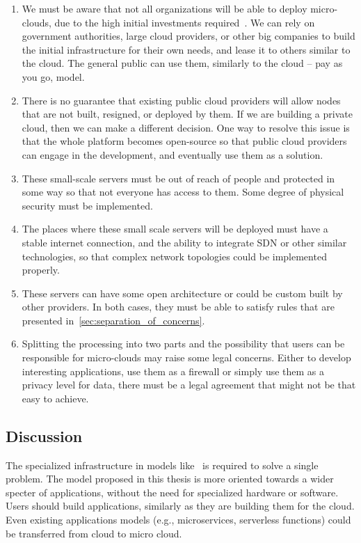 \begin{enumerate}[start=1,label={(\bfseries \arabic*)}]
	\item We must be aware that not all organizations will be able to deploy micro-clouds, due to the high initial investments required~\cite{MonsalveCC18}. We can rely on government authorities, large cloud providers, or other big companies to build the initial infrastructure for their own needs, and lease it to others similar to the cloud. The general public can use them, similarly to the cloud -- pay as you go, model.
	\item There is no guarantee that existing public cloud providers will allow nodes that are not built, resigned, or deployed by them. If we are building a private cloud, then  we can make a different decision. One way to resolve this issue is that the whole platform becomes open-source so that public cloud providers can engage in the development, and eventually use them as a solution.
	\item These small-scale servers must be out of reach of people and protected in some way so that not everyone has access to them. Some degree of physical security must be implemented.
	\item The places where these small scale servers will be deployed must have a stable internet connection, and the ability to integrate SDN or other similar technologies, so that complex network topologies could be implemented properly.
	\item These servers can have some open architecture or could be custom built by other providers. In both cases, they must be able to satisfy rules that are presented in~\ref{sec:separation_of_concerns}.
	\item Splitting the processing into two parts and the possibility that users can be responsible for micro-clouds may raise some legal concerns. Either to develop interesting applications, use them as a firewall or simply use them as a privacy level for data, there must be a legal agreement that might not be that easy to achieve.
\end{enumerate}
%
%
\subsection{Discussion}
%
The specialized infrastructure in models like~\cite{BaccarelliNSSA17, GuoRG20, JeonK19, BCAK19, ChiariniRAMG13} is required to solve a single problem. The model proposed in this thesis is more oriented towards a wider specter of applications, without the need for specialized hardware or software. Users should build applications, similarly as they are building them for the cloud. Even existing applications models (e.g., microservices, serverless functions) could be transferred from cloud to micro cloud.

